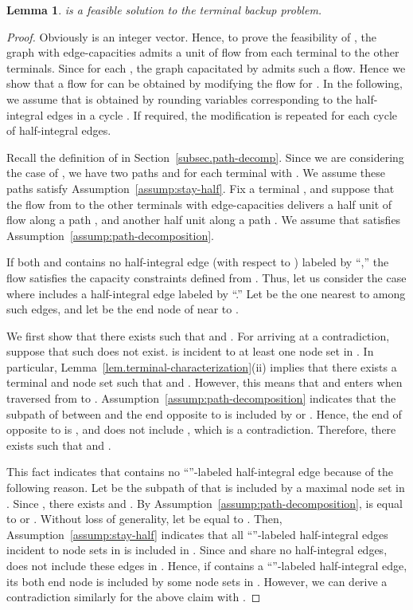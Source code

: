 \documentclass{article}
\newtheorem{lemma}{Lemma}
\begin{document}
\begin{lemma}\label{lem.feasibility-easy}
  is a feasible solution to the terminal backup problem.
\end{lemma}
 \begin{proof}
  Obviously  is an integer vector. Hence, to prove the feasibility
  of , the graph with edge-capacities 
  admits a unit of flow from each terminal  to the other terminals.
  Since  for each ,
  the graph capacitated by  admits such a flow.
  Hence we show that a flow for  can be obtained by
  modifying the flow for .
  In the following, we assume that  is obtained by rounding variables
  corresponding to the half-integral edges in a cycle .
  If required, the modification is repeated for each cycle of half-integral edges.

  Recall the definition of  in Section~\ref{subsec.path-decomp}.
  Since we are considering the case of , we have two paths  and
   for each terminal  with .
  We assume these paths satisfy Assumption~\ref{assump:stay-half}.
  Fix a terminal , and 
  suppose that the flow from  to the other terminals
  with edge-capacities  delivers a half unit of flow along a path ,
  and another half unit along a path .
  We assume that  satisfies Assumption~\ref{assump:path-decomposition}.

  If both  and  contains no half-integral edge (with respect to ) labeled by
  ``,''
  the flow satisfies the capacity constraints defined from .
  Thus, let us consider the case where  includes a half-integral edge labeled
  by ``.''
    Let  be the one nearest to  among such edges, and let  be
  the end node of  near to .

  We first show that there exists  such that  and . For arriving at a contradiction,
  suppose that such  does not exist.
   is incident to at least one node set in .
  In particular, Lemma~\ref{lem.terminal-characterization}(ii)
  implies that there exists a terminal  and node set  such that  and
  .
  However, this means that  and  enters  when traversed from
   to .
  Assumption~\ref{assump:path-decomposition} indicates that
  the subpath of  between  and the end opposite to  is included
  by
   or . Hence,
  the end of  opposite to  is , and  does not include
  , which is a contradiction. Therefore,
  there exists  such that  and .

  This fact indicates that  contains no ``''-labeled half-integral
  edge because of the following reason.
  Let  be the subpath of  that is included by a maximal node set
  in .
  Since , there exists  and .
  By Assumption~\ref{assump:path-decomposition},
   is equal to  or . Without loss of generality, let  be
  equal to .
  Then, Assumption~\ref{assump:stay-half} indicates that 
  all ``''-labeled half-integral edges incident to node sets in
    is included in .
  Since  and  share no half-integral edges,  does not include
  these edges in .
  Hence, if  contains a ``''-labeled half-integral edge, its both
  end node is included by some node sets in .
  However, we can derive a contradiction similarly for the above claim
  with .


\end{proof}
\end{document}

